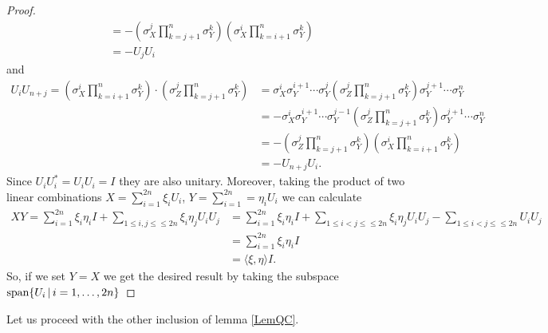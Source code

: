 \begin{proof}
\begin{align*}
&= - ( \sigma_X^j \prod_{k = j+1}^{n}\sigma_Y^k)(\sigma_X^i \prod_{k = i+1}^{n}\sigma_Y^k)  \\
&= -U_jU_i
\end{align*}
and 
\begin{align*}
U_iU_{n+j} =  (\sigma_X^i \prod_{k = i+1}^{n}\sigma_Y^k) \cdot( \sigma_Z^j \prod_{k = j+1}^{n}\sigma_Y^k) &=
\sigma_X^i \sigma_Y^{i+1} \cdots \sigma_Y^j ( \sigma_Z^j \prod_{k = j+1}^{n}\sigma_Y^k) \sigma_Y^{j+1} \cdots \sigma_Y^n \\
&= - \sigma_X^i \sigma_Y^{i+1} \cdots \sigma_Y^{j-1} ( \sigma_Z^j \prod_{k = j+1}^{n}\sigma_Y^k) \sigma_Y^{j+1} \cdots \sigma_Y^n  \\
&= - ( \sigma_Z^j \prod_{k = j+1}^{n}\sigma_Y^k)(\sigma_X^i \prod_{k = i+1}^{n}\sigma_Y^k)  \\
&= -U_{n+j}U_i.
\end{align*}
Since $ U_iU_i^* = U_iU_i =  I$ they are also unitary. 
Moreover, taking the product of two linear combinations $ X = \sum_{i = 1}^{2n}\xi_i U_i$, $ Y = \sum_{i = 1}^{2n} = \eta_iU_i $ we can calculate 
\begin{align*}
XY = \sum_{i = 1}^{2n} \xi_i \eta_i I + \sum_{1 \le i,j \le \le 2n}\xi_i\eta_j U_i U_j &= \sum_{i = 1}^{2n} \xi_i \eta_i I + \sum_{1 \le i < j \le \le 2n}\xi_i\eta_jU_iU_j - \sum_{1 \le i < j \le \le 2n}U_iU_j \\
&=\sum_{i = 1}^{2n} \xi_i \eta_i I \\
&= \langle \xi, \eta \rangle I.
\end{align*}
So, if we set $ Y = X $ we get the desired result by taking the subspace $ \textup{span} \{ U_i \, | \, i = 1,\hdots,2n \} $

\end{proof}

Let us proceed with the other inclusion of lemma \ref{LemQC}.

